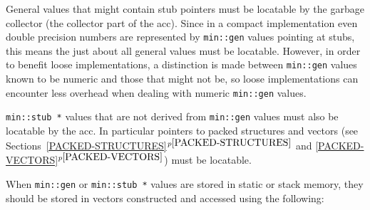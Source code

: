 \documentclass[12pt]{article}
\newcommand{\itemref}[1]{\ref{#1}$^{p\pageref{#1}}$}
\newcommand{\EOL}{\penalty \exhyphenpenalty}
\begin{document}
General values that might contain stub pointers must be locatable
by the garbage collector (the collector part of the acc).  Since
in a compact implementation even double precision numbers are
represented by \verb|min::gen| values pointing at stubs, this means
the just about all general values must be locatable.  However,
in order to benefit loose implementations, a distinction is made
between \verb|min::gen| values known to be numeric and those
that might not be, so loose implementations can encounter less overhead
when dealing with numeric \verb|min::gen| values.

{\tt min::\EOL stub~*} values that are not derived from
\verb|min::gen| values must also be locatable by the acc.
In particular
pointers to packed structures and vectors
(see Sections~\itemref{PACKED-STRUCTURES} and \itemref{PACKED-VECTORS})
must be locatable.

When \verb|min::gen| or \verb|min::stub *| values are stored
in static or stack memory, they
should be stored in vectors constructed and accessed using the following:
\end{document}
